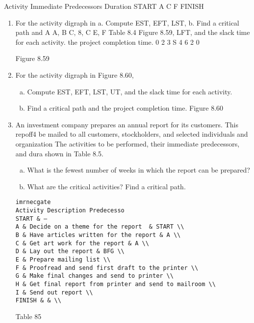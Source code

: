 \documentclass{article}
\begin{document}
Activity Immediate Predecessors Duration START A C F FINISH 
\begin{enumerate}
\item For the activity digraph in a. Compute EST, EFT, LST, b. Find a critical path and 
A A, B C, 8, C E, F 
Table 8.4 
Figure 8.59, LFT, and the slack time for each activity. the project completion time. 
0 2 3 S 4 6 2 0 

Figure 8.59 



\item  For the activity digraph in Figure 8.60,
\begin{enumerate}[(a)]
\item Compute EST, EFT, LST, UT, and the slack time for each activity. 
\item Find a critical path and the project completion time. 
Figure 8.60 
\end{enumerate}
\item  An investment company prepares an annual report for its customers. This repoff4 
be mailed to all customers, stockholders, and selected individuals and organization 
The activities to be performed, their immediate predecessors, and dura 
shown in Table 8.5. 
\begin{enumerate}[(a)]
\item  What is the fewest number of weeks in which the report can be prepared? 
\item What are the critical activities? Find a critical path. 
\end{enumerate}
\begin{verbatim}
imrnecgate 
Activity Description Predecesso 
START & — 
A & Decide on a theme for the report  & START \\
B & Have articles written for the report & A \\
C & Get art work for the report & A \\
D & Lay out the report & BFG \\
E & Prepare mailing list \\
F & Proofread and send first draft to the printer \\
G & Make final changes and send to printer \\
H & Get final report from printer and send to mailroom \\
I & Send out report \\
FINISH & & \\
\end{verbatim}
Table 85 

\end{enumerate}
\end{document}
